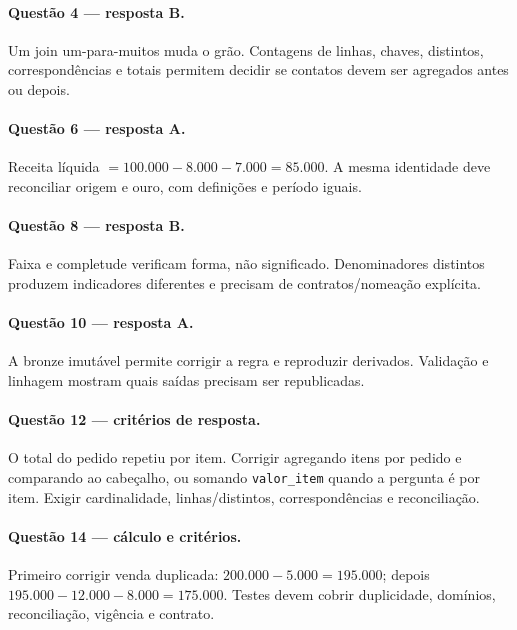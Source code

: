 \paragraph{Questão 4 — resposta B.} Um join um-para-muitos muda o grão. Contagens de linhas, chaves, distintos, correspondências e totais permitem decidir se contatos devem ser agregados antes ou depois.
\paragraph{Questão 6 — resposta A.} Receita líquida $=100.000-8.000-7.000=85.000$. A mesma identidade deve reconciliar origem e ouro, com definições e período iguais.
\paragraph{Questão 8 — resposta B.} Faixa e completude verificam forma, não significado. Denominadores distintos produzem indicadores diferentes e precisam de contratos/nomeação explícita.
\paragraph{Questão 10 — resposta A.} A bronze imutável permite corrigir a regra e reproduzir derivados. Validação e linhagem mostram quais saídas precisam ser republicadas.
\paragraph{Questão 12 — critérios de resposta.} O total do pedido repetiu por item. Corrigir agregando itens por pedido e comparando ao cabeçalho, ou somando \texttt{valor\_item} quando a pergunta é por item. Exigir cardinalidade, linhas/distintos, correspondências e reconciliação.
\paragraph{Questão 14 — cálculo e critérios.} Primeiro corrigir venda duplicada: $200.000-5.000=195.000$; depois $195.000-12.000-8.000=175.000$. Testes devem cobrir duplicidade, domínios, reconciliação, vigência e contrato.

